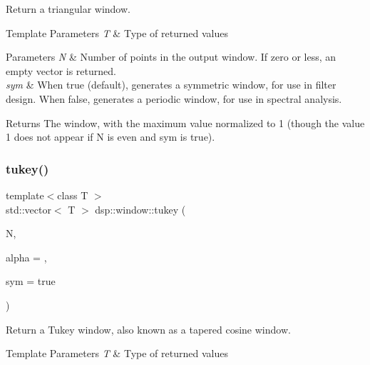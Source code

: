 Return a triangular window. 


\begin{DoxyTemplParams}{Template Parameters}
{\em T} & Type of returned values \\
\hline
\end{DoxyTemplParams}

\begin{DoxyParams}{Parameters}
{\em N} & Number of points in the output window. If zero or less, an empty vector is returned. \\
\hline
{\em sym} & When true (default), generates a symmetric window, for use in filter design. When false, generates a periodic window, for use in spectral analysis. \\
\hline
\end{DoxyParams}
\begin{DoxyReturn}{Returns}
The window, with the maximum value normalized to 1 (though the value 1 does not appear if N is even and sym is true). 
\end{DoxyReturn}
\mbox{\label{namespacedsp_1_1window_afb244cc8f82873d0e8a8d25394266ecc}} 
\subsubsection{\texorpdfstring{tukey()}{tukey()}}
{\footnotesize\ttfamily template$<$class T $>$ \\
std\+::vector$<$ T $>$ dsp\+::window\+::tukey (\begin{DoxyParamCaption}\item[{unsigned}]{N,  }\item[{T}]{alpha = {},  }\item[{bool}]{sym = {\ttfamily true} }\end{DoxyParamCaption})}



Return a Tukey window, also known as a tapered cosine window. 


\begin{DoxyTemplParams}{Template Parameters}
{\em T} & Type of returned values \\
\hline
\end{DoxyTemplParams}

